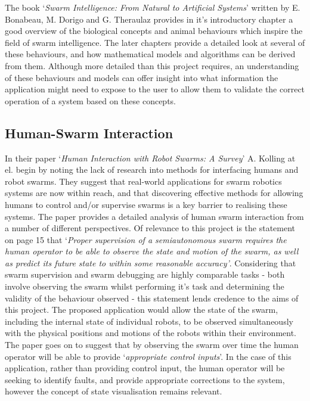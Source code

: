 \documentclass[titlepage,hidelinks,10pt]{article}
\begin{document}
The book `\textit{Swarm Intelligence: From Natural to Artificial Systems}\cite{FromNaturaltoArtificial}' written by E. Bonabeau, M. Dorigo and G. Theraulaz provides in it's introductory chapter a good overview of the biological concepts and animal behaviours which inspire the field of swarm intelligence. The later chapters provide a detailed look at several of these behaviours, and how mathematical models and algorithms can be derived from them. Although more detailed than this project requires, an understanding of these behaviours and models can offer insight into what information the application might need to expose to the user to allow them to validate the correct operation of a system based on these concepts. 

\subsection{Human-Swarm Interaction} \label{HumanSwarmInteraction}
In their paper `\textit{Human Interaction with Robot Swarms: A Survey}\cite{HumanSwarmInteractionSurvey}' A. Kolling at el. begin by noting the lack of research into methods for interfacing humans and robot swarms. They suggest that real-world applications for swarm robotics systems are now within reach, and that discovering effective methods for allowing humans to control and/or supervise swarms is a key barrier to realising these systems. The paper provides a detailed analysis of human swarm interaction from a number of different perspectives. Of relevance to this project is the statement on page 15 that `\textit{Proper supervision of a semiautonomous swarm requires the human operator to be able to observe the state and motion of the swarm, as well as predict its future state to within some reasonable accuracy'}. Considering that swarm supervision and swarm debugging are highly comparable tasks - both involve observing the swarm whilst performing it's task and determining the validity of the behaviour observed  - this statement lends credence to the aims of this project. The proposed application would allow the state of the swarm, including the internal state of individual robots, to be observed simultaneously with the physical positions and motions of the robots within their environment. The paper goes on to suggest that by observing the swarm over time the human operator will be able to provide `\textit{appropriate control inputs}'. In the case of this application, rather than providing control input, the human operator will be seeking to identify faults, and provide appropriate corrections to the system, however the concept of state visualisation remains relevant.
\end{document}
